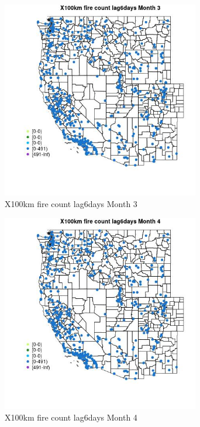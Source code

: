 \begin{figure} 
\centering  
\includegraphics[width=0.77\textwidth]{Code_Outputs/Report_ML_input_PM25_Step4_part_e_de_duplicated_aves_compiled_2019-05-14wNAs_MapObsMo3X100km_fire_count_lag6days.jpg} 
\caption{\label{fig:Report_ML_input_PM25_Step4_part_e_de_duplicated_aves_compiled_2019-05-14wNAsMapObsMo3X100km_fire_count_lag6days}X100km fire count lag6days Month 3} 
\end{figure} 
 

\clearpage 

\begin{figure} 
\centering  
\includegraphics[width=0.77\textwidth]{Code_Outputs/Report_ML_input_PM25_Step4_part_e_de_duplicated_aves_compiled_2019-05-14wNAs_MapObsMo4X100km_fire_count_lag6days.jpg} 
\caption{\label{fig:Report_ML_input_PM25_Step4_part_e_de_duplicated_aves_compiled_2019-05-14wNAsMapObsMo4X100km_fire_count_lag6days}X100km fire count lag6days Month 4} 
\end{figure} 
 

